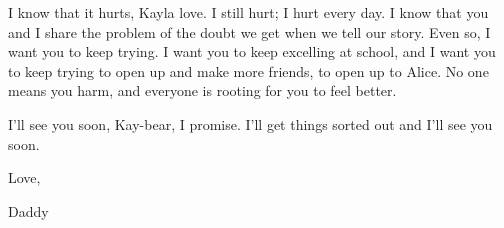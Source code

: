\begin{itshape}
I know that it hurts, Kayla love.  I still hurt; I hurt every day.  I know that you and I share the problem of the doubt we get when we tell our story.  Even so, I want you to keep trying.  I want you to keep excelling at school, and I want you to keep trying to open up and make more friends, to open up to Alice.  No one means you harm, and everyone is rooting for you to feel better.

I'll see you soon, Kay-bear, I promise.  I'll get things sorted out and I'll see you soon.

Love,

Daddy
\end{itshape}
